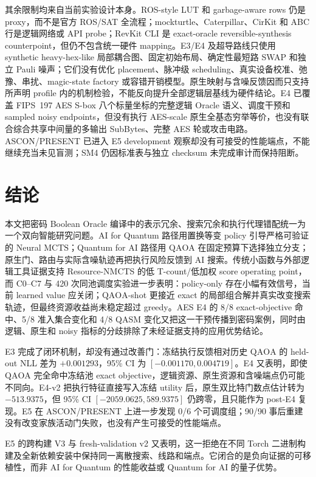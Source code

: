 \documentclass[UTF8,fontset=fandol,11pt]{ctexart}
\newcommand{\method}{Resource-NMCTS}
\newcommand{\mcts}{\ensuremath{\mathrm{MCTS}}}
\newcommand{\qaoa}{\ensuremath{\mathrm{QAOA}}}
\begin{document}
其余限制均来自当前实验设计本身。ROS-style LUT 和 garbage-aware rows 仍是 proxy，而不是官方 ROS/SAT 全流程；mockturtle、Caterpillar、CirKit 和 ABC 行是逻辑网络或 API probe；RevKit CLI 是 exact-oracle reversible-synthesis counterpoint，但仍不包含统一硬件 mapping。E3/E4 及超导路线只使用 synthetic heavy-hex-like 局部耦合图、固定初始布局、确定性最短路 SWAP 和独立 Pauli 噪声；它们没有优化 placement、脉冲级 scheduling、真实设备校准、弛豫、串扰、magic-state factory 或容错开销模型。原生映射与含噪反馈因而只支持所声明 profile 内的机制检验，不能反向提升全部逻辑层基线为硬件结论。E4 已覆盖 FIPS~197 AES S-box 八个标量坐标的完整逻辑 Oracle 语义、调度干预和 sampled noisy endpoints，但没有执行 AES-scale 原生全基态穷举等价，也没有联合综合共享中间量的多输出 SubBytes、完整 AES 轮或攻击电路。ASCON/PRESENT 已进入 E5 development 观察却没有可接受的性能端点，不能继续充当未见盲测；SM4 仍因标准表与独立 checksum 未完成审计而保持阻断。

\section{结论}

本文把密码 Boolean Oracle 编译中的表示冗余、搜索冗余和执行代理错配统一为一个双向智能研究问题。AI for Quantum 路径用置换等变 policy 引导严格可验证的 Neural \mcts{}；Quantum for AI 路径用 \qaoa{} 在固定预算下选择独立分支；原生门、路由与实际含噪轨迹再把执行风险反馈到 AI 搜索。传统小函数与外部逻辑工具证据支持 \method{} 的低 T-count/低加权 score operating point，而 C0--C7 与 420 次同池调度实验进一步表明：policy-only 存在小幅有效信号，当前 learned value 应关闭；\qaoa{}-shot 更接近 exact 的局部组合解并真实改变搜索轨迹，但最终资源收益尚未稳定超过 greedy。AES E4 的 8/8 exact-objective 命中、5/8 准入集合变化和 4/8 QASM 变化又把这一干预传播到密码案例，同时由逻辑、原生和 noisy 指标的分歧排除了未经证据支持的应用优势结论。

E3 完成了闭环机制，却没有通过改善门：冻结执行反馈相对历史 \qaoa{} 的 held-out NLL 差为 $+0.001293$，95\% CI 为 $[-0.001170,0.004719]$。E4 又表明，即使 \qaoa{} 完全命中冻结池 exact objective，逻辑资源、原生资源和含噪端点仍可能不同向。E4-v2 把执行特征直接写入冻结 utility 后，原生双比特门数点估计转为 $-513.9375$，但 95\% CI $[-2059.0625,589.9375]$ 仍跨零，且只能作为 post-E4 复现。E5 在 ASCON/PRESENT 上进一步发现 0/6 个可调度组；90/90 事后重建没有改变家族活动门失败，也没有产生可接受的性能端点。

E5 的跨构建 V3 与 fresh-validation v2 又表明，这一拒绝在不同 Torch 二进制构建及全新依赖安装中保持同一离散搜索、线路和端点。它闭合的是负向证据的可移植性，而非 AI for Quantum 的性能收益或 Quantum for AI 的量子优势。
\end{document}
